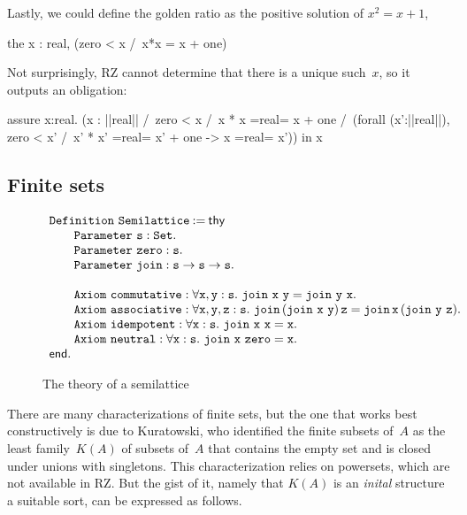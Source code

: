 \iflong
Lastly, we could define the golden ratio as the positive solution of
$x^2 = x + 1$,
%
\begin{source}
the x : real, (zero < x /\ x*x = x + one)
\end{source}
%
Not surprisingly, RZ cannot determine that there is a unique such~$x$,
so it outputs an obligation:
%
\begin{source}
assure x:real.
  (x : ||real|| /\ zero < x /\ x * x =real= x + one /\
     (forall (x':||real||),  zero < x' /\ x' * x' =real= x' + one ->
        x =real= x'))
  in x
\end{source}
\fi %

\subsection{Finite sets}
\label{sec:finite-sets}

\begin{figure}[t]
  \centering
\[
\begin{array}{l}
\iDefinition{\mathtt{Semilattice}}{\mathsf{thy}}\\
\qquad \iParameter{\mathtt{s}}{\iSet}.\\
\qquad \iParameter{\mathtt{zero}}{\mathtt{s}}.\\
\qquad \iParameter{\mathtt{join}}{\mathtt{s}\to\mathtt{s}\to\mathtt{s}}.\\
\\
\qquad \iAxiom{\mathtt{commutative}}{\forall \mathtt{x},\mathtt{y}:\mathtt{s}.\ \mathtt{join\ x\ y} = \mathtt{join\ y\ x}}.\\
\qquad \iAxiom{\mathtt{associative}}{\forall \mathtt{x},\mathtt{y},\mathtt{z}:\mathtt{s}.\ \mathtt{join}\,(\mathtt{join\ x\ y})\,\mathtt{z} = \mathtt{join}\,\mathtt{x}\, (\mathtt{join\ y\ z})}.\\
\qquad \iAxiom{\mathtt{idempotent}}{\forall \mathtt{x}:\mathtt{s}.\ \mathtt{join\ x\ x} = \mathtt{x}}.\\
\qquad \iAxiom{\mathtt{neutral}}{\forall \mathtt{x}:\mathtt{s}.\ \mathtt{join\ x\ zero} = \mathtt{x}}.\\
\mathsf{end}.
\end{array}
\]
  \caption{The theory of a semilattice}
  \label{fig:semilattice}
\end{figure}

There are many characterizations of finite sets, but the one that
works best constructively is due to Kuratowski, who identified the
finite subsets of~$A$ as the least family~$K(A)$ of subsets of~$A$
that contains the empty set and is closed under unions with
singletons. This characterization relies on powersets, which are not
available in RZ. But the gist of it, namely that $K(A)$ is an
\emph{inital} structure a suitable sort, can be expressed as follows.

